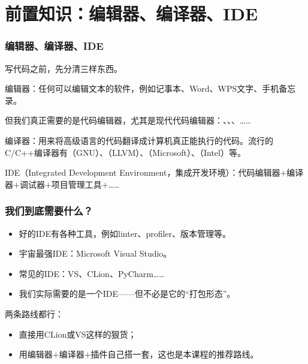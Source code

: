 \section{前置知识：编辑器、编译器、IDE}

\begin{frame}
    \frametitle{编辑器、编译器、IDE}
    写代码之前，先分清三样东西。

    \alert{编辑器}：任何可以编辑文本的软件，例如记事本、Word、WPS文字、手机备忘录。

    但我们真正需要的是\alert{代码编辑器}，尤其是\alert{现代代码编辑器}：、、、……

    \alert{编译器}：用来将高级语言的代码翻译成计算机真正能执行的代码。流行的C/C++编译器有（GNU）、（LLVM）、（Microsoft）、（Intel）等。

    \alert{IDE}（Integrated Development Environment，集成开发环境）：代码编辑器$+$编译器$+$调试器$+$项目管理工具$+$……
\end{frame}

\begin{frame}
    \frametitle{我们到底需要什么？}
    \begin{itemize}
        \item 好的IDE有各种工具，例如linter、profiler、版本管理等。
        \item \alert{宇宙最强IDE}：Microsoft Visual Studio。
        \item 常见的IDE：VS、CLion、PyCharm……
        \item 我们实际需要的是一个IDE——但不必是它的“打包形态”。
    \end{itemize}

    两条路线都行：
    \begin{itemize}
        \item 直接用CLion或VS这样的狠货；
        \item 用编辑器$+$编译器$+$插件自己搭一套，这也是本课程的推荐路线。
    \end{itemize}
\end{frame}

